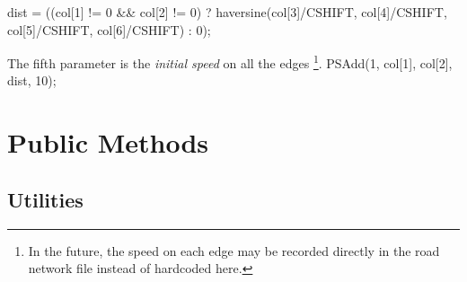 \documentclass{article}
\def\nwendcode{\endtrivlist \endgroup}
\let\nwdocspar=\par
\theoremstyle{definition}
\begin{document}
dist = ((col[1] != 0 && col[2] != 0)
  ? haversine(col[3]/CSHIFT, col[4]/CSHIFT,
              col[5]/CSHIFT, col[6]/CSHIFT) : 0);
\nwendcode{}\nwdocspar
The fifth parameter is the \textit{initial speed} on all the edges \footnote{In
the future, the speed on each edge may be recorded directly in the road network
file instead of hardcoded here.}.
\nwenddocs{}\endmoddef{}
PSAdd(1, col[1], col[2], dist, 10);
\nwendcode{}\nwdocspar

\section{Public Methods}
\label{sec:public-methods}

\subsection{Utilities}
\label{sec:utilities}
\end{document}
